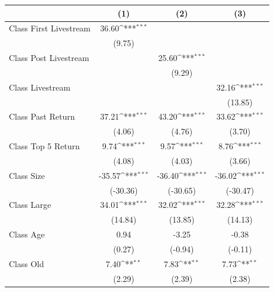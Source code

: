 {
\def\sym#1{\ifmmode^{#1}\else\(^{#1}\)\fi}
\begin{tabular}{l*{3}{c}}
\toprule
                    &\multicolumn{1}{c}{(1)}         &\multicolumn{1}{c}{(2)}         &\multicolumn{1}{c}{(3)}         \\
\midrule
Class First Livestream&       36.60\sym{***}&                     &                     \\
                    &      (9.75)         &                     &                     \\
\addlinespace
Class Post Livestream&                     &       25.60\sym{***}&                     \\
                    &                     &      (9.29)         &                     \\
\addlinespace
Class Livestream    &                     &                     &       32.16\sym{***}\\
                    &                     &                     &     (13.85)         \\
\addlinespace
Class Past Return   &       37.21\sym{***}&       43.20\sym{***}&       33.62\sym{***}\\
                    &      (4.06)         &      (4.76)         &      (3.70)         \\
\addlinespace
Class Top 5 Return  &        9.74\sym{***}&        9.57\sym{***}&        8.76\sym{***}\\
                    &      (4.08)         &      (4.03)         &      (3.66)         \\
\addlinespace
Class Size          &      -35.57\sym{***}&      -36.40\sym{***}&      -36.02\sym{***}\\
                    &    (-30.36)         &    (-30.65)         &    (-30.47)         \\
\addlinespace
Class Large         &       34.01\sym{***}&       32.02\sym{***}&       32.28\sym{***}\\
                    &     (14.84)         &     (13.85)         &     (14.13)         \\
\addlinespace
Class Age           &        0.94         &       -3.25         &       -0.38         \\
                    &      (0.27)         &     (-0.94)         &     (-0.11)         \\
\addlinespace
Class Old           &        7.40\sym{**} &        7.83\sym{**} &        7.73\sym{**} \\
                    &      (2.29)         &      (2.39)         &      (2.38)         \\

\end{tabular}}
